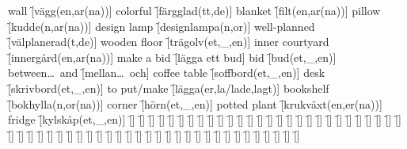 \begin{questions}
\begin{multicols}{2}
        \question wall \f[vägg(en,ar(na))]
        \question colorful \f[färgglad(tt,de)]
        \question blanket \f[filt(en,ar(na))]
        \question pillow \f[kudde(n,ar(na))]
        \question design lamp \f[designlampa(n,or)]
        \question well-planned \f[välplanerad(t,de)]
        \question wooden floor \f[trägolv(et,\_,en)]
        \question inner courtyard \f[innergård(en,ar(na))]
        \question make a bid \f[lägga ett bud]
        \question bid \f[bud(et,\_,en)]
        \question between\ldots\ and \f[mellan\ldots\ och]
        \question coffee table \f[soffbord(et,\_,en)]
        \question desk \f[skrivbord(et,\_,en)]
        \question to put/make \f[lägga(er,la/lade,lagt)]
        \question bookshelf \f[bokhylla(n,or(na))]
        \question corner \f[hörn(et,\_,en)]
        \question potted plant \f[krukväxt(en,er(na))]
        \question fridge \f[kylskåp(et,\_,en)]
        \question  \f[]
        \question  \f[]
        \question  \f[]
        \question  \f[]
        \question  \f[]
        \question  \f[]
        \question  \f[]
        \question  \f[]
        \question  \f[]
        \question  \f[]
        \question  \f[]
        \question  \f[]
        \question  \f[]
        \question  \f[]
        \question  \f[]
        \question  \f[]
        \question  \f[]
        \question  \f[]
        \question  \f[]
        \question  \f[]
        \question  \f[]
        \question  \f[]
        \question  \f[]
        \question  \f[]
        \question  \f[]
        \question  \f[]
        \question  \f[]
        \question  \f[]
        \question  \f[]
        \question  \f[]
        \question  \f[]
        \question  \f[]
        \question  \f[]
        \question  \f[]
        \question  \f[]
        \question  \f[]
        \question  \f[]
        \question  \f[]
        \question  \f[]
        \question  \f[]
        \question  \f[]
        \question  \f[]
        \question  \f[]
        \question  \f[]
        \question  \f[]
        \question  \f[]
        \question  \f[]
        \question  \f[]
        \question  \f[]
        \question  \f[]
        \question  \f[]
        \question  \f[]
        \question  \f[]
        \question  \f[]
        \question  \f[]
        \question  \f[]
        \question  \f[]
        \question  \f[]
    \end{multicols}
\end{questions}
